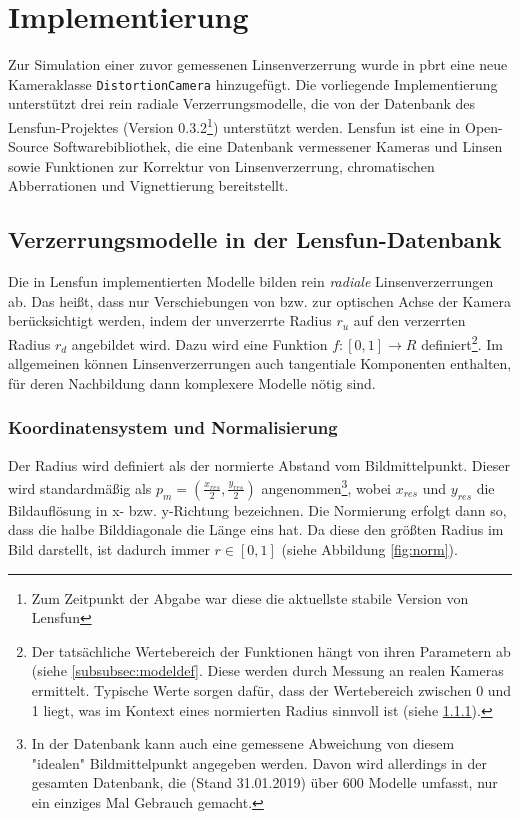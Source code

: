\section{Implementierung}

Zur Simulation einer zuvor gemessenen Linsenverzerrung wurde in pbrt eine neue Kameraklasse \texttt{DistortionCamera} hinzugefügt. Die vorliegende Implementierung unterstützt drei rein radiale Verzerrungsmodelle, die von der Datenbank des Lensfun-Projektes (Version 0.3.2\footnote{Zum Zeitpunkt der Abgabe war diese die aktuellste stabile Version von Lensfun}) unterstützt werden. Lensfun ist eine in Open-Source Softwarebibliothek, die eine Datenbank vermessener Kameras und Linsen sowie Funktionen zur Korrektur von Linsenverzerrung, chromatischen Abberrationen und Vignettierung bereitstellt.

\subsection{Verzerrungsmodelle in der Lensfun-Datenbank}

Die in Lensfun implementierten Modelle bilden rein \emph{radiale} Linsenverzerrungen ab. Das heißt, dass nur Verschiebungen von bzw. zur optischen Achse der Kamera berücksichtigt werden, indem der unverzerrte Radius $r_u$ auf den verzerrten Radius $r_d$ angebildet wird. Dazu wird eine Funktion $f:[0,1] \rightarrow R$ definiert\footnote{Der tatsächliche Wertebereich der Funktionen hängt von ihren Parametern ab (siehe \ref{subsubsec:modeldef}. Diese werden durch Messung an realen Kameras ermittelt. Typische Werte sorgen dafür, dass der Wertebereich zwischen 0 und 1 liegt, was im Kontext eines normierten Radius sinnvoll ist (siehe \ref{subsubsec:norm_radius}).}. Im allgemeinen können Linsenverzerrungen auch tangentiale Komponenten enthalten, für deren Nachbildung dann komplexere Modelle nötig sind.

\subsubsection{Koordinatensystem und Normalisierung}
\label{subsubsec:norm_radius}

Der Radius wird definiert als der normierte Abstand vom Bildmittelpunkt. Dieser wird standardmäßig als $p_m = (\frac{x_{res}}{2}, \frac{y_{res}}{2})$ angenommen\footnote{In der Datenbank kann auch eine gemessene Abweichung von diesem "idealen" Bildmittelpunkt angegeben werden. Davon wird allerdings in der gesamten Datenbank, die (Stand 31.01.2019) über 600 Modelle umfasst, nur ein einziges Mal Gebrauch gemacht.}, wobei $x_{res}$ und $y_{res}$ die Bildauflösung in x- bzw. y-Richtung bezeichnen. Die Normierung erfolgt dann so, dass die halbe Bilddiagonale die Länge eins hat. Da diese den größten Radius im Bild darstellt, ist dadurch immer $r \in [0,1]$ (siehe Abbildung \ref{fig:norm}). 


